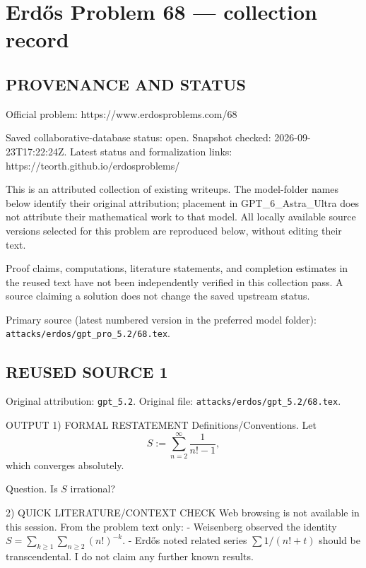 \section*{Erd\H{o}s Problem 68 --- collection record}

\subsection*{PROVENANCE AND STATUS}
Official problem: https://www.erdosproblems.com/68

Saved collaborative-database status: open.
Snapshot checked: 2026-09-23T17:22:24Z.
Latest status and formalization links: https://teorth.github.io/erdosproblems/

This is an attributed collection of existing writeups. The model-folder names below identify their original attribution; placement in GPT\_6\_Astra\_Ultra does not attribute their mathematical work to that model. All locally available source versions selected for this problem are reproduced below, without editing their text.

Proof claims, computations, literature statements, and completion estimates in the reused text have not been independently verified in this collection pass. A source claiming a solution does not change the saved upstream status.

Primary source (latest numbered version in the preferred model folder): \texttt{attacks/erdos/gpt\_pro\_5.2/68.tex}.

\subsection*{REUSED SOURCE 1}
Original attribution: \texttt{gpt\_5.2}.
Original file: \texttt{attacks/erdos/gpt\_5.2/68.tex}.


OUTPUT
1) FORMAL RESTATEMENT
Definitions/Conventions.
Let
\[S:=\sum_{n=2}^{\infty}\frac{1}{n!-1},\]
which converges absolutely.

Question.
Is $S$ irrational?

2) QUICK LITERATURE/CONTEXT CHECK
Web browsing is not available in this session.
From the problem text only:
- Weisenberg observed the identity $S=\sum_{k\ge 1}\sum_{n\ge 2}(n!)^{-k}$.
- Erd\H{o}s noted related series $\sum 1/(n!+t)$ should be transcendental.
I do not claim any further known results.

